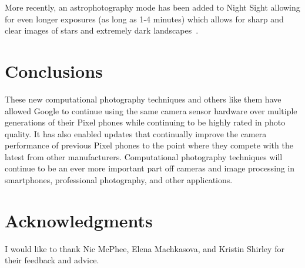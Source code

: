 \documentclass{sig-alternate}
\begin{document}
More recently, an astrophotography mode has been added to Night Sight allowing for even longer exposures (as long as 1-4 minutes) which allows for sharp and clear images of stars and extremely dark landscapes~\cite{blog:Kainz2019}.



\section{Conclusions}

These new computational photography techniques and others like them have allowed Google to continue using the same camera sensor hardware over multiple generations of their Pixel phones while continuing to be highly rated in photo quality. It has also enabled updates that continually improve the camera performance of previous Pixel phones to the point where they compete with the latest from other manufacturers. 
Computational photography techniques will continue to be an ever more important part off cameras and image processing in smartphones, professional photography, and other applications.

\section*{Acknowledgments}

I would like to thank Nic McPhee, Elena Machkasova, and Kristin Shirley for their feedback and advice.

\label{sec:acknowledgments}



  
\end{document}
